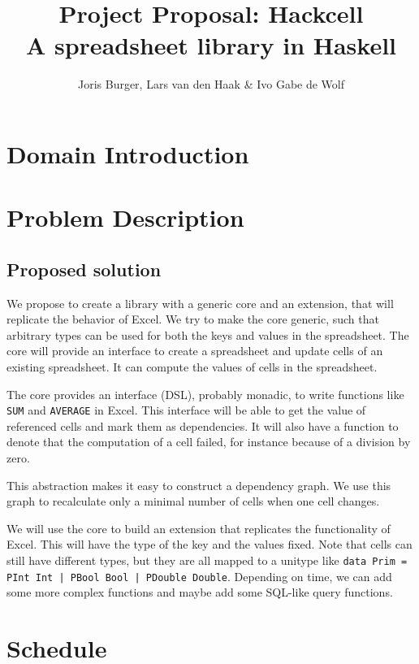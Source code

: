 \documentclass{article}
\title{
	\vskip -3cm
	Project Proposal: Hackcell \\
	\vskip 0.5cm
	\large{A spreadsheet library in Haskell}
}
\author{Joris Burger, Lars van den Haak \& Ivo Gabe de Wolf}
\begin{document}
	\maketitle
	\section{Domain Introduction}
	
	\section{Problem Description}
	
	\subsection{Proposed solution}
	We propose to create a library with a generic core and an extension, that will replicate the behavior of Excel. We try to make the core generic, such that arbitrary types can be used for both the keys and values in the spreadsheet. The core will provide an interface to create a spreadsheet and update cells of an existing spreadsheet. It can compute the values of cells in the spreadsheet.
	
	The core provides an interface (DSL), probably monadic, to write functions like \texttt{SUM} and \texttt{AVERAGE} in Excel. This interface will be able to get the value of referenced cells and mark them as dependencies. It will also have a function to denote that the computation of a cell failed, for instance because of a division by zero.
	
	This abstraction makes it easy to construct a dependency graph. We use this graph to recalculate only a minimal number of cells when one cell changes.
	
	We will use the core to build an extension that replicates the functionality of Excel. This will have the type of the key and the values fixed. Note that cells can still have different types, but they are all mapped to a unitype like \texttt{data Prim = PInt Int | PBool Bool | PDouble Double}. Depending on time, we can add some more complex functions and maybe add some SQL-like query functions.
	
	\section{Schedule}
\end{document}
